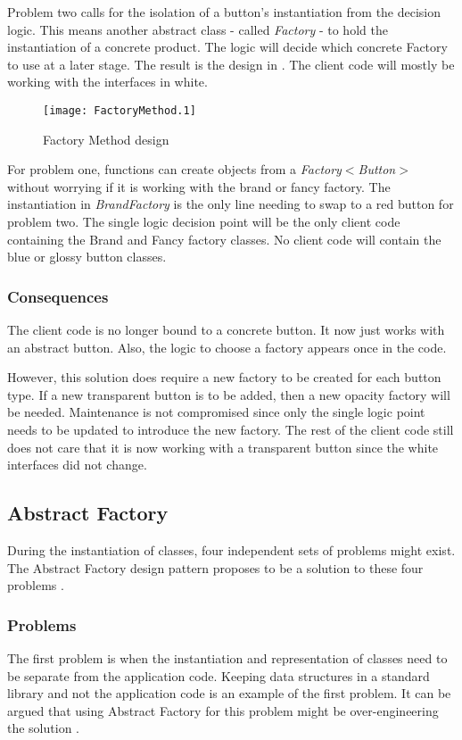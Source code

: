 Problem two calls for the isolation of a button's instantiation from the decision logic.
This means another abstract class - called \textit{Factory} - to hold the instantiation of a concrete product.
The logic will decide which concrete Factory to use at a later stage.
The result is the design in .
The client code will mostly be working with the interfaces in white.

\begin{figure}[h]
	\centering
	\texttt{[image: FactoryMethod.1]}
	\caption{Factory Method design}
	\label{fig:FactoryMethod}
\end{figure}

For problem one, functions can create objects from a \textit{Factory$<$Button$>$} without worrying if it is working with the brand or fancy factory.
The instantiation in \textit{BrandFactory} is the only line needing to swap to a red button for problem two.
The single logic decision point will be the only client code containing the Brand and Fancy factory classes.
No client code will contain the blue or glossy button classes.

\subsubsection{Consequences}
The client code is no longer bound to a concrete button.
It now just works with an abstract button.
Also, the logic to choose a factory appears once in the code.

However, this solution does require a new factory to be created for each button type.
If a new transparent button is to be added, then a new opacity factory will be needed.
Maintenance is not compromised since only the single logic point needs to be updated to introduce the new factory.
The rest of the client code still does not care that it is now working with a transparent button since the white interfaces did not change.

\subsection{Abstract Factory}
\label{sec:design-abstract-factory}
During the instantiation of classes, four independent sets of problems might exist.
The Abstract Factory design pattern proposes to be a solution to these four problems \cite{gamma_94_01}.

\subsubsection{Problems}
The first problem is when the instantiation and representation of classes need to be separate from the application code.
Keeping data structures in a standard library and not the application code is an example of the first problem.
It can be argued that using Abstract Factory for this problem might be over-engineering the solution \cite{kerievsky_05_01}.

